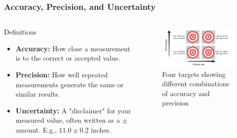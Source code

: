 \documentclass{beamer}
\begin{document}
\begin{frame}
    \frametitle{Accuracy, Precision, and Uncertainty}
    \begin{columns}
        \begin{column}{0.5\textwidth}
            \begin{block}{Definitions}
                \begin{itemize}
                    \item \textbf{Accuracy:} How close a measurement is to the correct or accepted value.
                    \item \textbf{Precision:} How well repeated measurements generate the same or similar results.
                    \item \textbf{Uncertainty:} A "disclaimer" for your measured value, often written as a \(\pm\) amount. E.g., \(11.0 \pm 0.2\) inches.
                \end{itemize}
            \end{block}
        \end{column}
        \begin{column}{0.5\textwidth}
            \begin{figure}
    \centering
    \includegraphics[width=0.8\linewidth]{phys11-accuracy-precision-targets.png}
    \caption{Four targets showing different combinations of accuracy and precision}
\end{figure}
        \end{column}
    \end{columns}
\end{frame}
\end{document}
